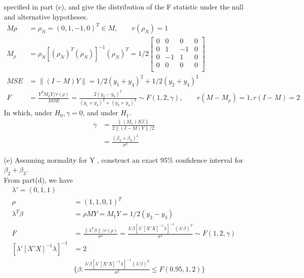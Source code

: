 \begin{itemize}
specified in part (c), and give the distribution of the F statistic under the null and
alternative hypotheses.\\
\begin{align*}
    M\rho &=  \rho_N= (0, 1, -1, 0)^T \in M, \qquad r(\rho_N) = 1\\
    M_{\rho} &= \rho_N [(\rho_N)^T (\rho_N)]^{-1} (\rho_N)^T=1/2 \begin{bmatrix}
           0  & 0 & 0 & 0  \\
           0 &  1 & -1 & 0\\
           0  & -1 & 1 & 0 \\
           0 & 0 & 0 & 0\\
         \end{bmatrix}\\
    MSE &= \lVert (I-M)Y \rVert = 1/2 (y_1+y_4)^2 + 1/2 (y_2 + y_4)^2 \\
    F &= \frac{Y^T M_{\rho} Y/r(\rho)}{MSE} = \frac{2(y_2 - y_3)^2}{(y_1+y_4)^2 + (y_2 + y_4)^2} \sim F(1,2, \gamma), \qquad r(M-M_{\rho}) = 1, r(I-M) = 2
\end{align*} 
In which, under $H_0, \gamma = 0$, and under $H_1$.
\begin{align*}
    \gamma &= \frac{\lVert (M_1) X\beta \rVert}{2 \lVert (I-M)Y \rVert/2}\\
    &= \frac{(\beta_2 + \beta_3)^2}{\sigma^2}
\end{align*} 
\item[(e)] Assuming normality for Y , construct an exact 95$\%$ confidence interval for $\beta_2 + \beta_3$.\\
From part(d), we have
\begin{align*}
 \lambda' = (0, 1, 1)\\
 \rho &= (1, 1, 0, 1)^T\\
 \lambda^T \beta &=  \rho M Y = M_1 Y= 1/2 (y_2 - y_3)\\
  F &= \frac{\lVert \lambda^T \beta \rVert/r(\rho)}{\sigma^2} = \frac{\lambda'\beta [\lambda'[X'X]^{-1} \lambda]^{-1} (\lambda'\beta)^T }{\sigma^2} \sim F(1,2, \gamma)\\
  [\lambda'[X'X]^{-1} \lambda]^{-1} & = 2\\
 &\{\beta: \frac{\lambda'\beta [\lambda'[X'X]^{-1} \lambda]^{-1} (\lambda'\beta)^T }{\sigma^2} \leq F(0.95, 1,2) \} 
\end{align*} 

\end{itemize}